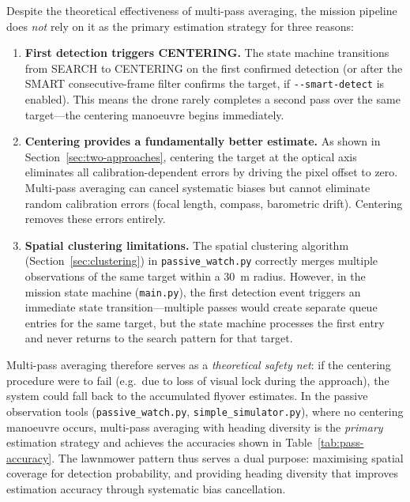 Despite the theoretical effectiveness of multi-pass averaging, the mission pipeline does \emph{not} rely on it as the primary estimation strategy for three reasons:

\begin{enumerate}
  \item \textbf{First detection triggers CENTERING.}  The state machine transitions from SEARCH to CENTERING on the first confirmed detection (or after the SMART consecutive-frame filter confirms the target, if \texttt{-{}-smart-detect} is enabled).  This means the drone rarely completes a second pass over the same target---the centering manoeuvre begins immediately.

  \item \textbf{Centering provides a fundamentally better estimate.}  As shown in Section~\ref{sec:two-approaches}, centering the target at the optical axis eliminates all calibration-dependent errors by driving the pixel offset to zero.  Multi-pass averaging can cancel systematic biases but cannot eliminate random calibration errors (focal length, compass, barometric drift).  Centering removes these errors entirely.

  \item \textbf{Spatial clustering limitations.}  The spatial clustering algorithm (Section~\ref{sec:clustering}) in \texttt{passive\_watch.py} correctly merges multiple observations of the same target within a \SI{30}{\metre} radius.  However, in the mission state machine (\texttt{main.py}), the first detection event triggers an immediate state transition---multiple passes would create separate queue entries for the same target, but the state machine processes the first entry and never returns to the search pattern for that target.
\end{enumerate}

\noindent Multi-pass averaging therefore serves as a \emph{theoretical safety net}: if the centering procedure were to fail (e.g.\ due to loss of visual lock during the approach), the system could fall back to the accumulated flyover estimates.  In the passive observation tools (\texttt{passive\_watch.py}, \texttt{simple\_simulator.py}), where no centering manoeuvre occurs, multi-pass averaging with heading diversity is the \emph{primary} estimation strategy and achieves the accuracies shown in Table~\ref{tab:pass-accuracy}.  The lawnmower pattern thus serves a dual purpose: maximising spatial coverage for detection probability, and providing heading diversity that improves estimation accuracy through systematic bias cancellation.

